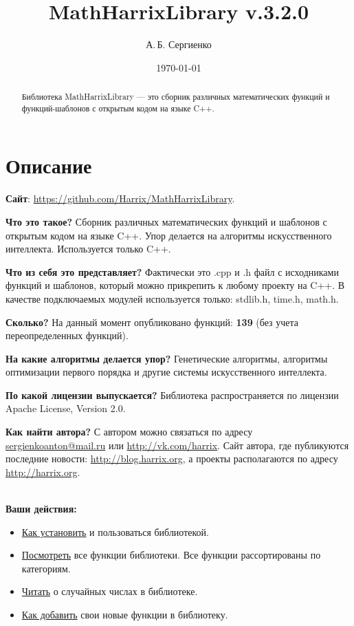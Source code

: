 \documentclass[a4paper,12pt]{article}
\title{MathHarrixLibrary v.3.2.0}
\author{А.\,Б. Сергиенко}
\date{\today}
\begin{document}


\maketitle

\begin{abstract}
Библиотека MathHarrixLibrary --- это сборник различных математических функций и функций-шаблонов с открытым кодом на языке C++.
\end{abstract}

\tableofcontents

\newpage

\section{Описание}

\textbf{Сайт}: \href{https://github.com/Harrix/MathHarrixLibrary}{https://github.com/Harrix/MathHarrixLibrary}.

\textbf{Что это такое?} Сборник различных математических функций и шаблонов с открытым кодом на языке C++. Упор делается на алгоритмы искусственного интеллекта. Используется только C++.

\textbf{Что из себя это представляет?} Фактически это .cpp и .h файл с исходниками функций и шаблонов, который можно прикрепить к любому проекту на C++. В качестве подключаемых модулей используется только: stdlib.h, time.h, math.h.

\textbf{Сколько?} На данный момент опубликовано функций: \textbf{139} (без учета переопределенных функций).

\textbf{На какие алгоритмы делается упор?} Генетические алгоритмы, алгоритмы оптимизации первого порядка и другие системы искусственного интеллекта.

\textbf{По какой лицензии выпускается?} Библиотека распространяется по лицензии Apache License, Version 2.0.

\textbf{Как найти автора?} С автором можно связаться по адресу \href {mailto:sergienkoanton@mail.ru} {sergienkoanton@mail.ru} или  \href {http://vk.com/harrix} {http://vk.com/harrix}. Сайт автора, где публикуются последние новости: \href {http://blog.harrix.org} {http://blog.harrix.org}, а проекты располагаются по адресу \href {http://harrix.org} {http://harrix.org}.

~\\

\textbf{Ваши действия:}

\begin{itemize}
\item \hyperref[section_install]{Как установить} и пользоваться библиотекой.
\item \hyperref[section_listfunctions]{Посмотреть} все функции библиотеки. Все функции рассортированы по категориям.
\item \hyperref[section_random]{Читать} о случайных числах в библиотеке.
\item \hyperref[section_addnew]{Как добавить} свои новые функции в библиотеку.
\end{itemize}
\end{document}
